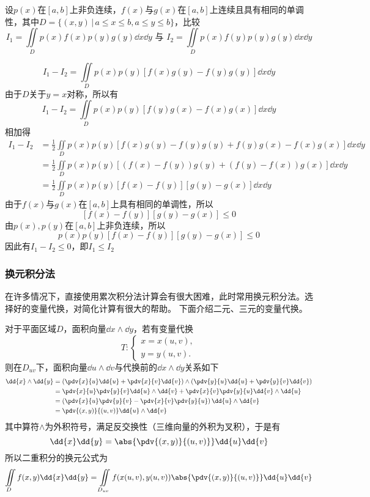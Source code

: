 \begin{example}
    设$p(x)$在$[a,b]$上非负连续，$f(x)$与$g(x)$在$[a,b]$上连续且具有相同的单调性，其中$D=\{ (x,y)\,|\, a\leq x \leq b, a\leq y \leq b \}$，比较
    \[ I_1 = \iint\limits_D p(x)f(x)p(y)g(y) \dd{x}\dd{y} \text{ 与~} I_2 = \iint\limits_D p(x)f(y)p(y)g(y)\dd{x}\dd{y} \]
\end{example}
\begin{solution}
    \[ I_1 - I_2 = \iint\limits_D p(x)p(y)[f(x)g(y) - f(y)g(y)]\dd{x}\dd{y} \]
    由于$D$关于$y=x$对称，所以有
    \[ I_1 - I_2 = \iint\limits_D p(x)p(y)[f(y)g(x) - f(x)g(x)]\dd{x}\dd{y} \]
    相加得
    \begin{align*}
        I_1 - I_2 & = \frac{1}{2}\iint\limits_D p(x)p(y)[f(x)g(y) - f(y)g(y) + f(y)g(x) - f(x)g(x)]\dd{x}\dd{y} \\
                  & = \frac{1}{2}\iint\limits_D p(x)p(y)[(f(x)-f(y))g(y) + (f(y)-f(x))g(x)]\dd{x}\dd{y}         \\
                  & = \frac{1}{2}\iint\limits_D p(x)p(y)[f(x)-f(y)][g(y)-g(x)]\dd{x}\dd{y}
    \end{align*}
    由于$f(x)$与$g(x)$在$[a,b]$上具有相同的单调性，所以
    \[ [f(x)-f(y)][g(y)-g(x)] \leq 0 \]
    由$p(x),p(y)$在$[a,b]$上非负连续，所以
    \[ p(x)p(y)[f(x)-f(y)][g(y)-g(x)] \leq 0 \]
    因此有$I_1 - I_2 \leq 0$，即$I_1\leq I_2$
\end{solution}

\subsubsection{换元积分法}
在许多情况下，直接使用累次积分法计算会有很大困难，此时常用换元积分法。选择好的变量代换，对简化计算有很大的帮助。
下面介绍二元、三元的变量代换。

对于平面区域$D$，面积向量$\dd{x}\wedge \dd{y}$，若有变量代换
\[
    T:
    \begin{cases}
        x=x(u,v), \\
        y=y(u,v).
    \end{cases}
\]
则在$D_{uv}$下，面积向量$\dd{u}\wedge\dd{v}$与代换前的$\dd{x}\wedge\dd{y}$关系如下
\begin{align*}
    \dd{x} \wedge \dd{y}
     & = \left(\pdv{x}{u}\dd{u} + \pdv{x}{v}\dd{v}\right) \wedge \left(\pdv{y}{u}\dd{u} +\pdv{y}{v}\dd{v}\right) \\
     & = \pdv{x}{u}\pdv{y}{v}\dd{u}\wedge\dd{v} + \pdv{x}{v}\pdv{y}{u}\dd{v}\wedge\dd{u}                         \\
     & = \left(\pdv{x}{u}\pdv{y}{v} - \pdv{x}{v}\pdv{y}{u}\right)\dd{u}\wedge\dd{v}                              \\
     & = \pdv{(x,y)}{(u,v)}\dd{u}\wedge\dd{v}
\end{align*}
其中算符$\wedge$为外积符号，满足反交换性（三维向量的外积为叉积），于是有
\[ \dd{x}\dd{y} = \abs{\pdv{(x,y)}{(u,v)}}\dd{u}\dd{v} \]
所以二重积分的换元公式为
\begin{equation}
    \iint\limits_D f(x,y)\dd{x}\dd{y} = \iint\limits_{D_{uv}}f(x(u,v),y(u,v)) \abs{\pdv{(x,y)}{(u,v)}}\dd{u}\dd{v}
\end{equation}

